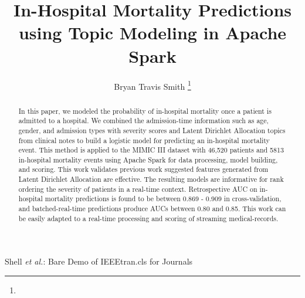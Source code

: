 \documentclass[journal]{IEEEtran}
\begin{document}
%
\title{In-Hospital Mortality Predictions using Topic Modeling in Apache Spark}
%
%
%

\author{Bryan Travis Smith
\thanks{}}


%
{Shell \MakeLowercase{\textit{et al.}}: Bare Demo of IEEEtran.cls for Journals}

\maketitle

\begin{abstract}
In this paper, we modeled the probability of in-hospital mortality once a patient is admitted to a hospital.  We combined the admission-time information such as age, gender, and admission types with severity scores and Latent Dirichlet Allocation topics from clinical notes to build a logistic model for predicting an in-hospital mortality event.   This method is applied to the MIMIC III dataset with 46,520 patients and 5813 in-hospital mortality events using Apache Spark for data processing, model building, and scoring.  This work validates previous work suggested features generated from Latent Dirichlet Allocation are effective.  The resulting models are informative for rank ordering the severity of patients in a real-time context.  Retrospective AUC on in-hospital mortality predictions is found to be between 0.869 - 0.909 in cross-validation, and batched-real-time predictions produce AUCs between 0.80 and 0.85.  This work can be easily adapted to a real-time processing and scoring of streaming medical-records.
\end{abstract}
\end{document}
